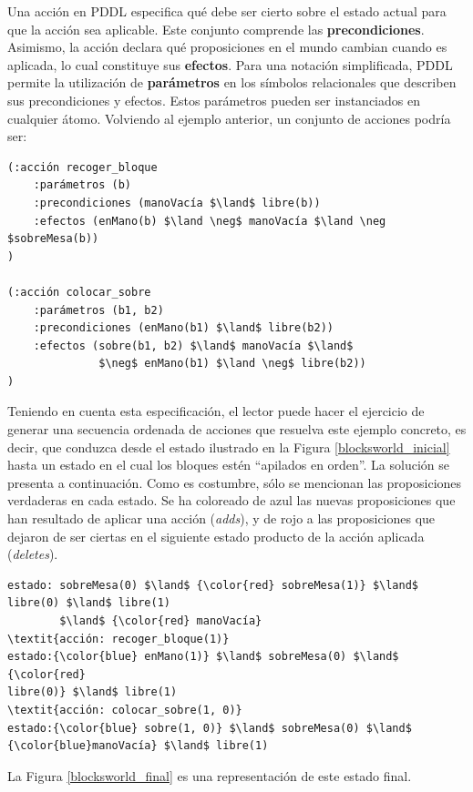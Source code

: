 Una acción en PDDL especifica qué debe ser cierto sobre el estado actual para
que la acción sea aplicable. 
Este conjunto comprende las \textbf{precondiciones}. Asimismo,
la acción declara qué proposiciones en el mundo cambian cuando es aplicada,
lo cual constituye sus \textbf{efectos}. Para una notación
simplificada, PDDL permite la utilización de \textbf{parámetros} en los
símbolos relacionales que describen sus precondiciones y efectos. Estos
parámetros pueden ser instanciados en cualquier átomo. Volviendo al
ejemplo anterior, un conjunto de acciones podría ser:
\begin{Verbatim}[commandchars=\\\{\},
codes={\catcode`$=3\catcode`^=7}]
(:acción recoger_bloque
    :parámetros (b)
    :precondiciones (manoVacía $\land$ libre(b))
    :efectos (enMano(b) $\land \neg$ manoVacía $\land \neg $sobreMesa(b))
)

(:acción colocar_sobre
    :parámetros (b1, b2)
    :precondiciones (enMano(b1) $\land$ libre(b2))
    :efectos (sobre(b1, b2) $\land$ manoVacía $\land$
              $\neg$ enMano(b1) $\land \neg$ libre(b2))
)
\end{Verbatim}

Teniendo en cuenta esta especificación, el lector puede hacer el ejercicio de
generar una secuencia ordenada de acciones que resuelva este ejemplo
concreto, es decir, que conduzca desde el estado ilustrado en la Figura
\ref{blocksworld_inicial} hasta un estado en el cual los bloques estén ``apilados en
orden''. La solución se presenta a continuación. Como es costumbre, sólo se
mencionan las proposiciones verdaderas en cada estado. Se ha coloreado de azul
las nuevas proposiciones que han resultado de aplicar una acción
(\textit{adds}), y de rojo a las proposiciones que dejaron de ser ciertas en el
siguiente estado producto de la acción aplicada (\textit{deletes}).
\begin{Verbatim}[commandchars=\\\{\},
codes={\catcode`$=3\catcode`^=7}]
estado: sobreMesa(0) $\land$ {\color{red} sobreMesa(1)} $\land$ libre(0) $\land$ libre(1)
        $\land$ {\color{red} manoVacía}
\textit{acción: recoger_bloque(1)}
estado:{\color{blue} enMano(1)} $\land$ sobreMesa(0) $\land$ {\color{red}
libre(0)} $\land$ libre(1)
\textit{acción: colocar_sobre(1, 0)}
estado:{\color{blue} sobre(1, 0)} $\land$ sobreMesa(0) $\land$ {\color{blue}manoVacía} $\land$ libre(1)
\end{Verbatim}

La Figura \ref{blocksworld_final} es una representación de este estado final.

